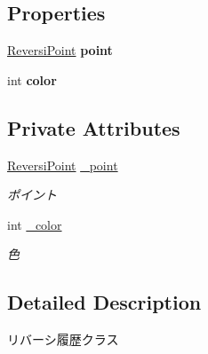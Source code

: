 \subsection*{Properties}
\begin{DoxyCompactItemize}
\item 
\mbox{\label{class_reversi_form_1_1_reversi_history_a93a56c75570ead744781098fbf0034e1}} 
\hyperlink{class_reversi_form_1_1_reversi_point}{Reversi\+Point} {\bfseries point}
\item 
\mbox{\label{class_reversi_form_1_1_reversi_history_a8cd4d59abb1e9947df382e6ca4efd11a}} 
int {\bfseries color}
\end{DoxyCompactItemize}
\subsection*{Private Attributes}
\begin{DoxyCompactItemize}
\item 
\mbox{\label{class_reversi_form_1_1_reversi_history_ab71f2570479c6c36edda763111b4312b}} 
\hyperlink{class_reversi_form_1_1_reversi_point}{Reversi\+Point} \hyperlink{class_reversi_form_1_1_reversi_history_ab71f2570479c6c36edda763111b4312b}{\+\_\+point}
\begin{DoxyCompactList}\small\item\em ポイント \end{DoxyCompactList}\item 
\mbox{\label{class_reversi_form_1_1_reversi_history_a95653f11a686a190edd8759a98884185}} 
int \hyperlink{class_reversi_form_1_1_reversi_history_a95653f11a686a190edd8759a98884185}{\+\_\+color}
\begin{DoxyCompactList}\small\item\em 色 \end{DoxyCompactList}\end{DoxyCompactItemize}


\subsection{Detailed Description}
リバーシ履歴クラス 

